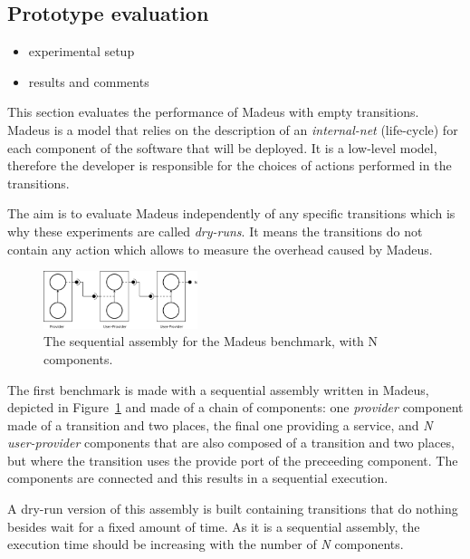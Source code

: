 
\subsection{Prototype evaluation}

\begin{itemize}
\item experimental setup
\item results and comments
\end{itemize}
This section evaluates the performance of Madeus with empty transitions.
Madeus is a model that relies on the description of an \emph{internal-net} (life-cycle) for each component of the software that will be deployed. It is a low-level model, therefore the developer is responsible for the choices of actions performed in the transitions.

The aim is to evaluate Madeus independently of any specific transitions which is why these experiments are called \emph{dry-runs}. It means the transitions do not contain any action which allows to measure the overhead caused by Madeus.



\begin{figure}[h]
  \begin{center}
    \includegraphics[width=0.4\textwidth]{./images/seq.pdf}
    \caption{The sequential assembly for the Madeus benchmark, with N components.}
    \label{fig:seq}
  \end{center}
\end{figure}

The first benchmark is made with a sequential assembly written in Madeus, depicted in Figure~\ref{fig:seq}
and made of a chain of components: one \emph{provider} component made of a transition and two places, the final one providing a service, and \emph{N user-provider} components that are also composed of a transition and two places, but where the transition uses the provide port of the preceeding component. The components are connected and this results in a sequential execution.

A dry-run version of this assembly is built containing transitions that do nothing besides wait for a fixed amount of time. As it is a sequential assembly, the execution time should be increasing with the number of \emph{N} components.

